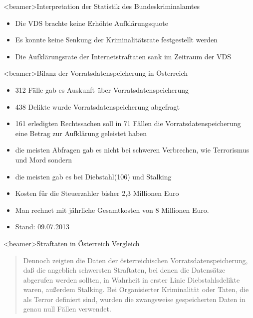               \begin{frame}<beamer>{Interpretation der Statistik des Bundeskriminalamtes}
\begin{itemize}
        \item Die VDS brachte keine Erhöhte Aufklärungsquote
        \item Es konnte keine Senkung der Kriminalitätsrate festgestellt werden
        \item Die Aufklärungsrate der Internetstraftaten sank im Zeitraum der VDS
    \end{itemize}
    \end{frame}
       \begin{frame}<beamer>{Bilanz der Vorratsdatenspeicherung in Österreich}
        \begin{itemize}
        \item 312 Fälle gab es Auskunft über Vorratsdatenspeicherung
        \item 438 Delikte wurde Vorratsdatenspeicherung abgefragt
        \item 161 erledigten Rechtssachen soll in 71 Fällen die Vorratsdatenspeicherung eine Betrag zur Aufklärung geleistet haben
        \item die meisten Abfragen gab es nicht bei schweren Verbrechen, wie Terrorismus und Mord sondern
        \item die meisten gab es bei Diebstahl(106) und Stalking
        \item Kosten für die Steuerzahler bisher 2,3 Millionen Euro
        \item Man rechnet mit jährliche Gesamtkosten von 8 Millionen Euro.
        \item Stand: 09.07.2013 
         \end{itemize}
    \end{frame}
    \begin{frame}<beamer>{Straftaten in Österreich Vergleich}
      \begin{quote}
        Dennoch zeigten die Daten der österreichischen Vorratsdatenspeicherung, daß die angeblich schwersten Straftaten, bei denen die Datensätze abgerufen werden sollten, in Wahrheit in erster Linie Diebstahlsdelikte waren, außerdem Stalking. Bei Organisierter Kriminalität oder Taten, die als Terror definiert sind, wurden die zwangsweise gespeicherten Daten in genau null Fällen verwendet.

      \end{quote}
    \end{frame}



